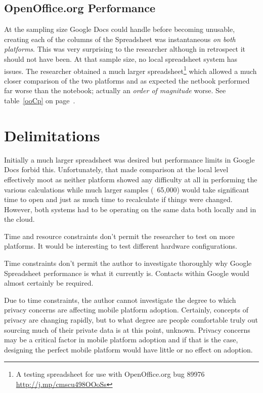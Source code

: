 \subsection{OpenOffice.org Performance}

At the sampling size Google Docs could handle before becoming unusable, creating
each of the columns of the Spreadsheet was instantaneous \emph{on both
  platforms}.  This was very surprising to the researcher although in retrospect
it should not have been.  At that sample size, no local spreadsheet system has
issues.  The researcher obtained a much larger spreadsheet\footnote{A testing
  spreadsheet for use with OpenOffice.org bug 89976
  \url{http://j.mp/cmscu498OOoSs}} which allowed a much closer comparison of the
two platforms and as expected the netbook performed far worse than the notebook;
actually an \emph{order of magnitude} worse. See table~\ref{ooCp} on page~\pageref{ooCp}.



\section{Delimitations}


Initially a much larger spreadsheet was desired but performance limits in Google
Docs forbid this.  Unfortunately, that made comparison at the local level
effectively moot as neither platform showed any difficulty at all in performing
the various calculations while much larger samples (~65,000) would take
significant time to open and just as much time to recalculate if things were
changed.  However, both systems had to be operating on the same data both
locally and in the cloud.

Time and resource constraints don't permit the researcher to test on more
platforms.  It would be interesting to test different hardware configurations.

Time constraints don't permit the author to investigate thoroughly why Google
Spreadsheet performance is what it currently is.  Contacts within Google would
almost certainly be required.

Due to time constraints, the author cannot investigate the degree to which
privacy concerns are affecting mobile platform adoption.  Certainly, concepts of
privacy are changing rapidly, but to what degree are people comfortable truly
out sourcing much of their private data is at this point, unknown.  Privacy
concerns may be a critical factor in mobile platform adoption and if that is the
case, designing the perfect mobile platform would have little or no effect on
adoption.


